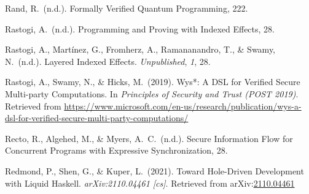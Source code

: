 \documentclass[12pt,twoside]{article}
\begin{document}
{\begin{thebibliography}{1079}
\mdbibitemlabel{}Rand, R.~(n.d.). Formally Verified Quantum Programming, 222.%

\mdbibitemlabel{}Rastogi, A.~(n.d.). Programming and Proving with Indexed Effects, 28.%

\mdbibitemlabel{}Rastogi, A., Martínez, G., Fromherz, A., Ramananandro, T., \& Swamy, N.~(n.d.). Layered Indexed Effects. \emph{Unpublished}, \emph{1}, 28.%

\mdbibitemlabel{}Rastogi, A., Swamy, N., \& Hicks, M.~(2019). Wys*: A DSL for Verified Secure Multi-party Computations. In \emph{Principles of Security and Trust (POST 2019)}. Retrieved from \href{https://www.microsoft.com/en-us/research/publication/wys-a-dsl-for-verified-secure-multi-party-computations/}{{\ttfamily https://\hspace{0pt}www.\hspace{0pt}microsoft.\hspace{0pt}com/\hspace{0pt}en-\hspace{0pt}us/\hspace{0pt}research/\hspace{0pt}publication/\hspace{0pt}wys-\hspace{0pt}a-\hspace{0pt}dsl-\hspace{0pt}for-\hspace{0pt}verified-\hspace{0pt}secure-\hspace{0pt}multi-\hspace{0pt}party-\hspace{0pt}computations/\hspace{0pt}}}%

\mdbibitemlabel{}Recto, R., Algehed, M., \& Myers, A.~C.~(n.d.). Secure Information Flow for Concurrent Programs with Expressive Synchronization, 28.%

\mdbibitemlabel{}Redmond, P., Shen, G., \& Kuper, L.~(2021). Toward Hole-Driven Development with Liquid Haskell. \emph{arXiv:2110.04461 {}[cs]}. Retrieved from arXiv:\href{http://arxiv.org/abs/2110.04461}{2110.04461}%


\end{thebibliography}}
\end{document}
